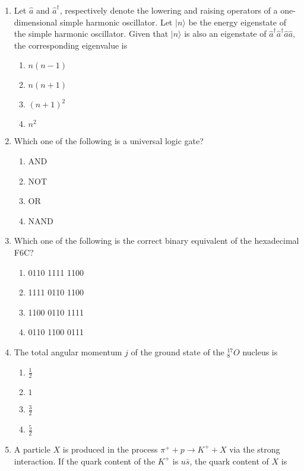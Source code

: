 \documentclass[journal]{IEEEtran}
\begin{document}
\begin{enumerate}

\item Let $\hat{a}$ and $\hat{a}^\dagger$, respectively denote the lowering and raising operators of a one-dimensional simple harmonic oscillator. Let $|n\rangle$ be the energy eigenstate of the simple harmonic oscillator. Given that $|n\rangle$ is also an eigenstate of $\hat{a}^\dagger\hat{a}^\dagger\hat{a}\hat{a}$, the corresponding eigenvalue is

\begin{enumerate}
\item $n(n-1)$
\item $n(n+1)$
\item $(n+1)^2$
\item $n^2$
\end{enumerate}

\item Which one of the following is a universal logic gate?

\begin{enumerate}
\item AND
\item NOT
\item OR
\item NAND
\end{enumerate}

\item Which one of the following is the correct binary equivalent of the hexadecimal F6C?

\begin{enumerate}
\item 0110 1111 1100
\item 1111 0110 1100
\item 1100 0110 1111
\item 0110 1100 0111
\end{enumerate}

\item The total angular momentum $j$ of the ground state of the ${}^{17}_{8}O$ nucleus is

\begin{enumerate}
\item $\frac{1}{2}$
\item $1$
\item $\frac{3}{2}$
\item $\frac{5}{2}$
\end{enumerate}

\item A particle $X$ is produced in the process $\pi^{+}+p\rightarrow K^{+}+X$ via the strong interaction. If the quark content of the $K^{+}$ is $u\bar{s}$, the quark content of $X$ is 


\end{enumerate}
\end{document}
